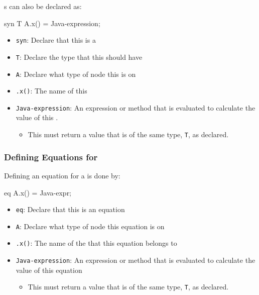 \begin{definition}
  s can also be declared as:
\begin{javasource}
  syn T A.x() = Java-expression;
\end{javasource}
  \begin{itemize}[noitemsep]
  \item \texttt{syn}: Declare that this  is a 
  \item \texttt{T}: Declare the type that this  should have
  \item \texttt{A}: Declare what type of  node this  is on
  \item \texttt{.x()}: The name of this 
  \item \texttt{Java-expression}: An expression or method that is evaluated to calculate the value of this .
    \begin{itemize}[noitemsep]
    \item This must return a value that is of the same type, \texttt{T}, as declared.
    \end{itemize}
  \end{itemize}
\end{definition}

\subsubsection{Defining Equations for }\label{subsubsec:Define_Synthesized_Equations}
Defining an equation for a  is done by:
\begin{javasource}
eq A.x() = Java-expr;
\end{javasource}
\begin{itemize}[noitemsep]
\item \texttt{eq}: Declare that this is an equation
\item \texttt{A}: Declare what type of  node this equation is on
\item \texttt{.x()}: The name of the  that this equation belongs to
\item \texttt{Java-expression}: An expression or method that is evaluated to calculate the value of this equation
  \begin{itemize}[noitemsep]
  \item This must return a value that is of the same type, \texttt{T}, as declared.
  \end{itemize}
\end{itemize}

